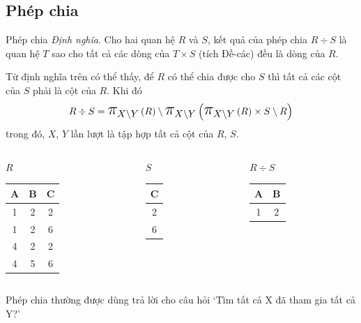 \documentclass[11pt]{beamer}
\newcommand{\mmm}[1]{\mathlarger{\mathlarger{\mathlarger#1}}}%
\newcommand{\ppi}[2]{\mmm{\pi}_{#1}\left(#2\right)}%
\begin{document}
  \subsection{Phép chia}
  \begin{frame}{Phép chia}
    \textit{Định nghĩa}. Cho hai quan hệ $R$ và $S$, kết quả của phép chia $R \div S$ là 
    quan hệ $T$ sao cho tất cả các dòng của $T \times S$ (tích Đề-các) đều là dòng của $R$.
  \end{frame}
  \begin{frame}
    Từ định nghĩa trên có thể thấy, để $R$ có thể chia được cho $S$ 
    thì tất cả các cột của $S$ phải là cột của $R$. Khi đó
    $$
    R \div S = \ppi{X \setminus Y}{R} \setminus \ppi{X \setminus Y}{{\ppi{X \setminus Y}{R} \times S} \setminus R}
    $$
    trong đó, $X$, $Y$ lần lượt là tập hợp tất cả cột của $R$, $S$.
  \end{frame}
  \begin{frame}
    \begin{columns}[T]
      \begin{column}{0.3\textwidth}
        \centering $R$
        \medskip \\
        \begin{tabular}{|c|c|c|}
          \hline
          \textbf{A} & \textbf{B} & \textbf{C}\\[0.5ex] \hline\hline
          \rowcolor{blue!25}
          1 & 2 & 2\\ \hline
          \rowcolor{blue!25}
          1 & 2 & 6\\ \hline
          4 & 2 & 2\\ \hline
          4 & 5 & 6\\ \hline
        \end{tabular}
      \end{column}
      \begin{column}{0.2\textwidth}
        \centering $S$
        \medskip \\
        \begin{tabular}{|c|}
          \hline
          \textbf{C} \\[0.5ex] \hline\hline
          2\\ \hline
          6\\ \hline          
        \end{tabular}
      \end{column}
      \begin{column}{0.3\textwidth}
        \centering $R \div S$
        \medskip \\
        \begin{tabular}{|c|c|}
          \hline
          \textbf{A} & \textbf{B} \\[0.5ex] \hline\hline
          1 & 2\\ \hline
        \end{tabular}
      \end{column}
    \end{columns}
  \end{frame}
  \begin{frame}
    Phép chia thường được dùng trả lời cho câu hỏi `Tìm tất cả X đã tham gia tất cả Y?'
  \end{frame}
\end{document}
